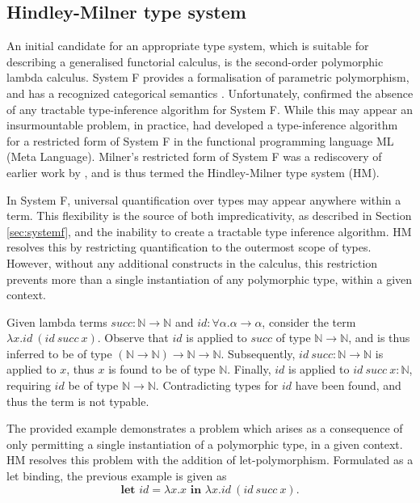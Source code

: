 \documentclass[../../Dissertation.tex]{subfiles}
\begin{document}
\subsection{Hindley-Milner type system}\label{sec:HMType}
An initial candidate for an appropriate type system, which is suitable for describing a generalised functorial calculus, is the second-order polymorphic lambda calculus. System F provides a formalisation of parametric polymorphism, and has a recognized categorical semantics \cite{SystemFVariableTypes}. Unfortunately,  confirmed the absence of any tractable type-inference algorithm for System F. While this may appear an insurmountable problem, in practice,  had developed a type-inference algorithm for a restricted form of System F in the functional programming language ML (Meta Language). Milner's restricted form of System F was a rediscovery of earlier work by , and is thus termed the Hindley-Milner type system (HM).
\par
In System F, universal quantification over types may appear anywhere within a term. This flexibility is the source of both impredicativity, as described in Section \ref{sec:systemf}, and the inability to create a tractable type inference algorithm. HM resolves this by restricting quantification to the outermost scope of types. However, without any additional constructs in the calculus, this restriction prevents more than a single instantiation of any polymorphic type, within a given context.
\par
Given lambda terms $\textit{succ} : \mathbb{N} \rightarrow \mathbb{N}$ and $\textit{id} : \forall \alpha. \alpha \rightarrow \alpha$, consider the term $\lambda x. \textit{id}\ (\textit{id}\ \textit{succ}\ x)$. Observe that $\textit{id}$ is applied to $\textit{succ}$ of type $\mathbb{N} \rightarrow \mathbb{N}$, and is thus inferred to be of type $(\mathbb{N} \rightarrow \mathbb{N}) \rightarrow \mathbb{N} \rightarrow \mathbb{N}$. Subsequently, $\textit{id}\ \textit{succ} : \mathbb{N} \rightarrow \mathbb{N}$ is applied to $x$, thus $x$ is found to be of type $\mathbb{N}$. Finally, $\textit{id}$ is applied to $\textit{id}\ \textit{succ}\ x : \mathbb{N}$, requiring $\textit{id}$ be of type $\mathbb{N} \rightarrow \mathbb{N}$. Contradicting types for $\textit{id}$ have been found, and thus the term is not typable. 
\par
The provided example demonstrates a problem which arises as a consequence of only permitting a single instantiation of a polymorphic type, in a given context. HM resolves this problem with the addition of let-polymorphism. Formulated as a let binding, the previous example is given as 
\begin{equation*}
\textbf{let } \textit{id} = \lambda x.x \textbf{ in } \lambda x.\textit{id}\ (\textit{id}\ succ\ x).
\end{equation*}
\end{document}

